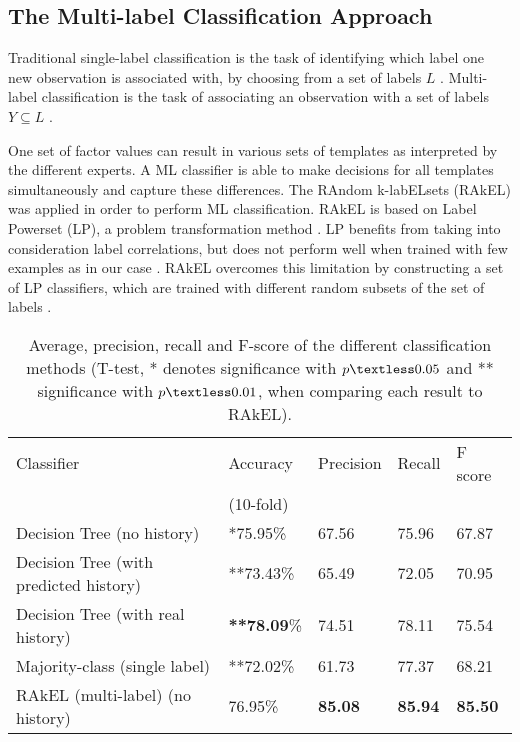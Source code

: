 \documentclass[11pt]{article}
\begin{document}
\subsection{The Multi-label Classification Approach}\label{multiLabel}

Traditional single-label classification is the task of identifying which label one new observation is 
associated with, by choosing from a set of labels $L$ \cite{Tsoumakas:2007}. Multi-label classification is the task of associating
an observation with a set of labels $Y \subseteq L $ \cite{Tsoumakas:2007}.

One set of factor values can result in various sets of templates as 
interpreted by the different experts. 
A ML classifier is able to make decisions for all templates simultaneously 
and capture these differences. 
The RAndom k-labELsets (RAkEL) \cite{Tsoumakas:2007} was applied in order to perform ML 
classification. RAkEL is based on Label Powerset (LP), a problem transformation method \cite{Tsoumakas:2007}. 
LP benefits from taking into consideration label correlations, but does not
perform well when trained with few examples as in our case \cite{Tsoumakas:2007}. 
RAkEL overcomes this limitation by constructing a set of LP classifiers, which are trained with different 
random subsets of the set of labels \cite{Tsoumakas:2007}. 

\begin{table*}[t]
\centering
\begin{tabular}{|l|l|l|l|l|}
 \hline
  Classifier & Accuracy & Precision & Recall & F score \\
 &(10-fold) & & & \\
\hline \hline
  Decision Tree (no history) & *75.95\% & 67.56 & 75.96 &  67.87\\
  Decision Tree (with predicted history) & **73.43\%  & 65.49& 72.05 & 70.95\\
	Decision Tree (with real history) & \textbf{**78.09}\% & 74.51 & 78.11& 75.54\\
	Majority-class (single label) &**72.02\%  & 61.73 & 77.37 & 68.21\\ \hline
	RAkEL (multi-label) (no history) & 76.95\%  & \textbf{85.08} & \textbf{85.94} & \textbf{85.50}\\
  \hline
\end{tabular}
\caption {Average, precision, recall and F-score of the different classification methods 
(T-test, * denotes significance with $p\textless 0.05$ 
 and ** significance with $p\textless 0.01$, when comparing each
 result to RAkEL).}
\label{comparisonClassif}
\end{table*}
\end{document}

